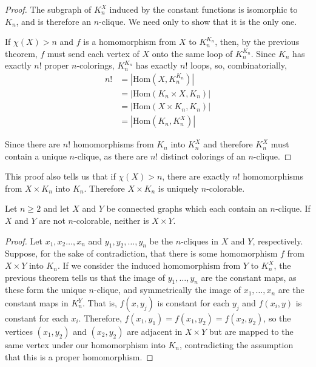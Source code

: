 \begin{proof}
	The subgraph of $K_n^X$ induced by the constant functions is isomorphic to $K_n$, and is therefore an $n$-clique.  We need only to show that it is the only one.
	
	If $\chi(X)>n$ and $f$ is a homomorphism from $X$ to $K_n^{K_n}$, then, by the previous theorem, $f$ must send each vertex of $X$ onto the same loop of $K_n^{K_n}$.  Since $K_n$ has exactly $n!$ proper $n$-colorings, $K_n^{K_n}$ has exactly $n!$ loops, so, combinatorially,
	\begin{align*}
	n!&=|\mathrm{Hom}(X,K_n^{K_n})|\\
	  &=|\mathrm{Hom}(K_n\times X,K_n)|\\
	  &=|\mathrm{Hom}(X\times K_n,K_n)|\\
	  &=|\mathrm{Hom}(K_n,K_n^X)|
	\end{align*} 
	
	Since there are $n!$ homomorphisms from $K_n$ into $K_n^X$ and therefore $K_n^X$ must contain a unique $n$-clique, as there are $n!$ distinct colorings of an $n$-clique.
\end{proof}

This proof also tells us that if $\chi(X)>n$, there are exactly $n!$ homomorphisms from $X\times K_n$ into $K_n$.  Therefore $X\times K_n$ is uniquely $n$-colorable.

\begin{theorem}
	Let $n\geq 2$ and let $X$ and $Y$ be connected graphs which each contain an $n$-clique.  If $X$ and $Y$ are not $n$-colorable, neither is $X\times Y$.
	
\end{theorem}
\begin{proof}
	Let $x_1,x_2\dots, x_n$ and $y_1,y_2,\dots,y_n$ be the $n$-cliques in $X$ and $Y$, respectively.  Suppose, for the sake of contradiction, that there is some homomorphism $f$ from $X\times Y$ into $K_n$.  If we consider the induced homomorphism from $Y$ to $K_n^X$, the previous theorem tells us that the image of $y_1,\dots,y_n$ are the constant maps, as these form the unique $n$-clique, and symmetrically the image of $x_1,\dots,x_n$ are the constant maps in $K_n^Y$.  That is, $f(x,y_j)$ is constant for each $y_j$ and $f(x_i,y)$ is constant for each $x_i$.  Therefore, $f(x_1,y_1)=f(x_1,y_2)=f(x_2,y_2)$, so the vertices $(x_1,y_2)$ and $(x_2,y_2)$ are adjacent in $X\times Y$ but are mapped to the same vertex under our homomorphism into $K_n$, contradicting the assumption that this is a proper homomorphism.
\end{proof}

